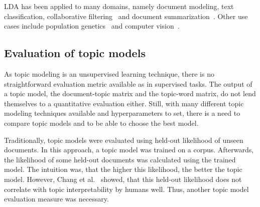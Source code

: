 \documentclass[
        a4paper,
        titlepage,
        twoside,
        parskip,
        numbers=noenddot
        ]{scrbook}
\theoremstyle{break}
\begin{document}
LDA has been applied to many domains, namely document modeling, text classification, collaborative filtering~\cite{Blei2003} and document summarization~\cite{Wang2009}.
Other use cases include population genetics~\cite{Pritchard2000} and computer vision~\cite{LiFei-Fei2005}.



\subsection{Evaluation of topic models}
\label{sec:evaluation_of_topic_models}
As topic modeling is an unsupervised learning technique, there is no straightforward evaluation metric available as in supervised tasks.
The output of a topic model, the document-topic matrix and the topic-word matrix, do not lend themselves to a quantitative evaluation either.
Still, with many different topic modeling techniques available and hyperparameters to set, there is a need to compare topic models and to be able to choose the best model.

Traditionally, topic models were evaluated using held-out likelihood of unseen documents.
In this approach, a topic model was trained on a corpus.
Afterwards, the likelihood of some held-out documents was calculated using the trained model.
The intuition was, that the higher this likelihood, the better the topic model.
However, Chang et al.~\cite{Chang2009} showed, that this held-out likelihood does not correlate with topic interpretability by humans well.
Thus, another topic model evaluation measure was necessary.
\end{document}

